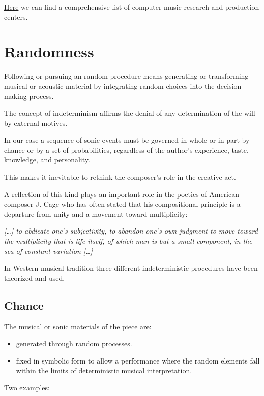\href{https://smcnetwork.org/centers.html}{Here} we can find a comprehensive list of computer music research and production centers.

\section{Randomness}\label{randomness}

Following or pursuing an random procedure means generating or transforming musical or acoustic material by integrating random choices into the decision-making process.

The concept of indeterminism affirms the denial of any determination of the will by external motives.

In our case a sequence of sonic events must be governed in whole or in part by chance or by a set of probabilities, regardless of the author's experience, taste, knowledge, and personality.

This makes it inevitable to rethink the composer's role in the creative act.

A reflection of this kind plays an important role in the poetics of American composer J. Cage who has often stated that his compositional principle is a departure from unity and a movement toward multiplicity:

\textit{ {[}\ldots{]} to abdicate one's subjectivity, to abandon one's own judgment to move toward the multiplicity that is life itself, of which man is but a small component, in the sea of constant variation
{[}\ldots{]}}

In Western musical tradition three different indeterministic procedures have been theorized and used.


\subsection{Chance }\label{chance}

The musical or sonic materials of the piece are:

\begin{itemize}
\item generated through random processes. 
\item fixed in symbolic form to allow a performance where the random elements fall within the limits of deterministic musical interpretation.
\end{itemize}

Two examples:

